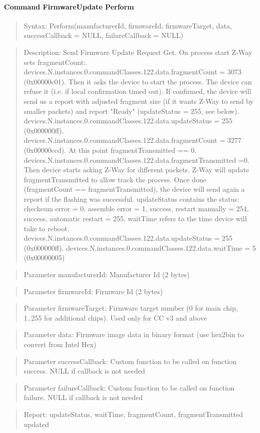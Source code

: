 \paragraph{Command FirmwareUpdate Perform}
\begin{quote}Syntax: Perform(manufacturerId, firmwareId, firmwareTarget, data, successCallback = NULL, failureCallback = NULL)\end{quote}
\begin{quote}Description: Send Firmware Update Request Get. On process start Z-Way sets fragmentCount:. devices.N.instances.0.commandClasses.122.data.fragmentCount = 3073 (0x00000c01). Then it asks the device to start the process. The device can refuse it (i.e. if local confirmation timed out). If confirmed, the device will send us a report with adjusted fragment size (if it wants Z-Way to send by smaller packets) and report "Ready" (updateStatus = 255, see below). devices.N.instances.0.commandClasses.122.data.updateStatus = 255 (0x000000ff). devices.N.instances.0.commandClasses.122.data.fragmentCount = 3277 (0x00000ccd). At this point fragmentTransmitted == 0. devices.N.instances.0.commandClasses.122.data.fragmentTransmitted =0. Then device starts asking Z-Way for different packets. Z-Way will update fragmentTransmitted to allow track the process. Once done (fragmentCount == fragmentTransmitted), the device will send again a report if the flashing was successful. updateStatus contains the status: checksum error = 0, assemble error = 1, success, restart manually = 254, success, automatic restart = 255. waitTime refers to the time device will take to reboot. devices.N.instances.0.commandClasses.122.data.updateStatus = 255 (0x000000ff). devices.N.instances.0.commandClasses.122.data.waitTime = 5 (0x00000005)\end{quote}
\begin{quote}Parameter manufacturerId: Manufacturer Id (2 bytes)\end{quote}
\begin{quote}Parameter firmwareId: Firmware Id (2 bytes)\end{quote}
\begin{quote}Parameter firmwareTarget: Firmware target number (0 for main chip, 1..255 for additional chips). Used only for CC v3 and above\end{quote}
\begin{quote}Parameter data: Firmware image data in binary format (use hex2bin to convert from Intel Hex)\end{quote}
\begin{quote}Parameter successCallback: Custom function to be called on function success. NULL if callback is not needed\end{quote}
\begin{quote}Parameter failureCallback: Custom function to be called on function failure. NULL if callback is not needed\end{quote}
\begin{quote}Report: updateStatus, waitTime, fragmentCount, fragmentTransmitted updated\end{quote}



